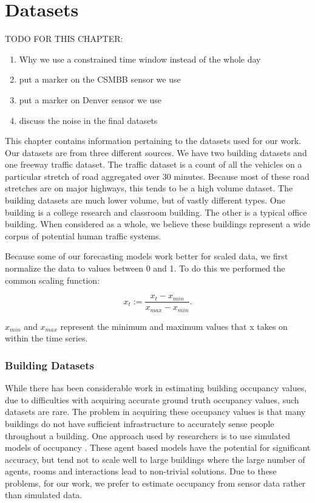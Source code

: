 \chapter{Datasets}

TODO FOR THIS CHAPTER:
\begin{enumerate}
	\item Why we use a constrained time window instead of the whole day
	\item put a marker on the CSMBB sensor we use
	\item put a marker on Denver sensor we use
	\item discuss the noise in the final datasets
\end{enumerate}

This chapter contains information pertaining to the datasets used for our work.  Our datasets are from three different sources.  We have two building datasets and one freeway traffic dataset.  The traffic dataset is a count of all the vehicles on a particular stretch of road aggregated over 30 minutes.  Because most of these road stretches are on major highways, this tends to be a high volume dataset.  The building datasets are much lower volume, but of vastly different types.  One building is a college research and classroom building.  The other is a typical office building.  When considered as a whole, we believe these buildings represent a wide corpus of potential human traffic systems.  

Because some of our forecasting models work better for scaled data, we first normalize the data to values between 0 and 1.  To do this we performed the common scaling function:

\begin{equation}
	x_{t} := \frac{x_{t} - x_{min}}{x_{max} - x_{min}}.
\end{equation}

$x_{min}$ and $x_{max}$ represent the minimum and maximum values that x takes on within the time series.

\subsection{Building Datasets}
While there has been considerable work in estimating building occupancy values, due to difficulties with acquiring accurate ground truth occupancy values, such datasets are rare.  The problem in acquiring these occupancy values is that many buildings do not have sufficient infrastructure to accurately sense people throughout a building.  One approach used by researchers is to use simulated models of occupancy \cite{page2008, goldstein2010}.  These agent based models have the potential for significant accuracy, but tend not to scale well to large buildings where the large number of agents, rooms and interactions lead to non-trivial solutions.  Due to these problems, for our work, we prefer to estimate occupancy from sensor data rather than simulated data.

